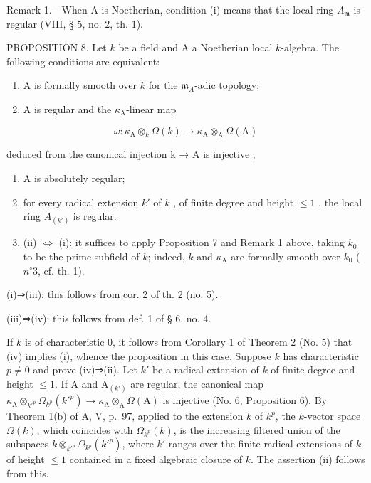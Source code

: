 Remark 1.—When A is Noetherian, condition (i) means that the local ring \(A_{\mathfrak{m}}\) is regular (VIII, § 5, no. 2, th. 1).

PROPOSITION 8. Let \(k\) be a field and A a Noetherian local \(k\)-algebra. The following conditions are equivalent:

\begin{enumerate}
\def\labelenumi{(\roman{enumi})}
\item
  A is formally smooth over \(k\) for the \(\mathfrak{m}_{A}\)-adic topology;
\item
  A is regular and the \(\kappa_{\mathrm{A}}\)-linear map
\end{enumerate}

\[
\omega : \kappa_ {\mathrm{A}} \otimes_ {k} \Omega (k) \longrightarrow \kappa_ {\mathrm{A}} \otimes_ {\mathrm{A}} \Omega (\mathrm{A})
\]

deduced from the canonical injection k → A is injective ;

\begin{enumerate}
\def\labelenumi{(\roman{enumi})}
\setcounter{enumi}{2}
\item
  A is absolutely regular;
\item
  for every radical extension \(k'\) of \(k\) , of finite degree and height \(\leqslant 1\) , the local ring \(A_{(k')}\) is regular.
\item
  (ii) \(\Leftrightarrow\) (i): it suffices to apply Proposition 7 and Remark 1 above, taking \(k_{0}\) to be the prime subfield of \(k\); indeed, \(k\) and \(\kappa_{\mathrm{A}}\) are formally smooth over \(k_{0}\) (\(n^{\circ}3\), cf. th. 1).
\end{enumerate}

(i)⇒(iii): this follows from cor. 2 of th. 2 (no. 5).

(iii)⇒(iv): this follows from def. 1 of § 6, no. 4.

If \(k\) is of characteristic 0, it follows from Corollary 1 of Theorem 2 (No. 5) that (iv) implies (i), whence the proposition in this case. Suppose \(k\) has characteristic \(p \neq 0\) and prove (iv)⇒(ii). Let \(k'\) be a radical extension of \(k\) of finite degree and height \(\leqslant 1\). If A and \(\mathrm{A}_{(k')}\) are regular, the canonical map \(\kappa_{\mathrm{A}} \otimes_{k'^{p}} \Omega_{k^{p}}(k'^{p}) \longrightarrow \kappa_{\mathrm{A}} \otimes_{\mathrm{A}} \Omega(\mathrm{A})\) is injective (No. 6, Proposition 6). By Theorem 1(b) of A, V, p.~97, applied to the extension \(k\) of \(k^{p}\), the \(k\)-vector space \(\Omega(k)\), which coincides with \(\Omega_{k^{p}}(k)\), is the increasing filtered union of the subspaces \(k \otimes_{k'^{p}} \Omega_{k^{p}}(k'^{p})\), where \(k'\) ranges over the finite radical extensions of \(k\) of height \(\leqslant 1\) contained in a fixed algebraic closure of \(k\). The assertion (ii) follows from this.

